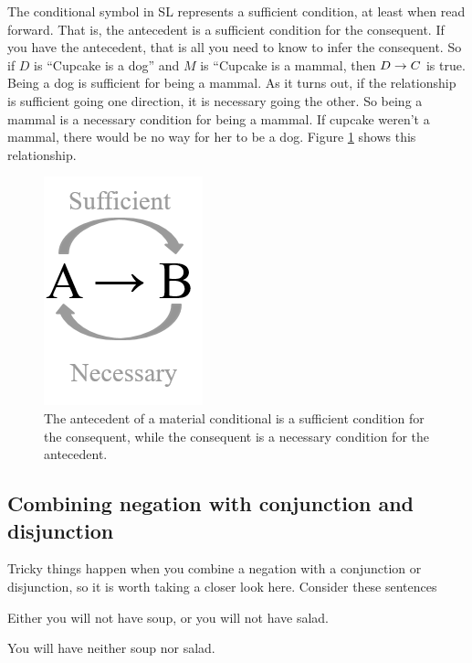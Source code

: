 The conditional symbol in SL represents a sufficient condition, at least when read forward. That is, the antecedent is a sufficient condition for the consequent. If you have the antecedent, that is all you need to know to infer the consequent. So if $D$ is ``Cupcake is a dog'' and $M$ is ``Cupcake is a mammal, then $D \rightarrow C$ is true. Being a dog is sufficient for being a mammal. As it turns out, if the relationship is sufficient going one direction, it is necessary going the other. So being a mammal is a necessary condition for being a mammal. If cupcake weren't a mammal, there would be no way for her to be a dog. Figure \ref{fig:necessary_and_sufficient} shows this relationship.

\begin{figure}
\begin{mdframed}[style=mytableclearbox, userdefinedwidth=.5\textwidth]
\begin{center}
\includegraphics*{img/necessaryandsufficient.png}
\end{center}
\end{mdframed}
\caption{The antecedent of a material conditional is a sufficient condition for the consequent, while the consequent is a necessary condition for the antecedent.}
\label{fig:necessary_and_sufficient}
\end{figure}


\subsection{Combining negation with conjunction and disjunction}

Tricky things happen when you combine a negation with a conjunction or disjunction, so it is worth taking a closer look here. Consider these sentences

\begin{earg}
\item[\ex{or3}] Either you will not have soup, or you will not have salad.
\item[\ex{or4}] You will have neither soup nor salad.
\end{earg}

